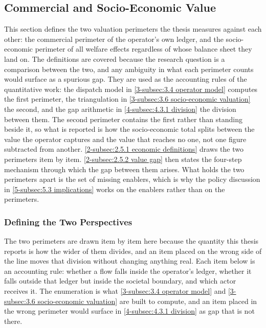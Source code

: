 \subsection{Commercial and Socio-Economic Value}
\label{2-subsec:2.5 commercial and societal value}

This section defines the two valuation perimeters the thesis measures against each other: the commercial perimeter of the operator's own ledger, and the socio-economic perimeter of all welfare effects regardless of whose balance sheet they land on. The definitions are covered because the research question is a comparison between the two, and any ambiguity in what each perimeter counts would surface as a spurious gap. They are used as the accounting rules of the quantitative work: the dispatch model in \autoref{3-subsec:3.4 operator model} computes the first perimeter, the triangulation in \autoref{3-subsec:3.6 socio-economic valuation} the second, and the gap arithmetic in \autoref{4-subsec:4.3.1 division} the division between them. The second perimeter contains the first rather than standing beside it, so what is reported is how the socio-economic total splits between the value the operator captures and the value that reaches no one, not one figure subtracted from another. \autoref{2-subsec:2.5.1 economic definitions} draws the two perimeters item by item. \autoref{2-subsec:2.5.2 value gap} then states the four-step mechanism through which the gap between them arises. What holds the two perimeters apart is the set of missing enablers, which is why the policy discussion in \autoref{5-subsec:5.3 implications} works on the enablers rather than on the perimeters.

\subsubsection{Defining the Two Perspectives}
\label{2-subsec:2.5.1 economic definitions}

The two perimeters are drawn item by item here because the quantity this thesis reports is how the wider of them divides, and an item placed on the wrong side of the line moves that division without changing anything real. Each item below is an accounting rule: whether a flow falls inside the operator's ledger, whether it falls outside that ledger but inside the societal boundary, and which actor receives it. The enumeration is what \autoref{3-subsec:3.4 operator model} and \autoref{3-subsec:3.6 socio-economic valuation} are built to compute, and an item placed in the wrong perimeter would surface in \autoref{4-subsec:4.3.1 division} as gap that is not there.

